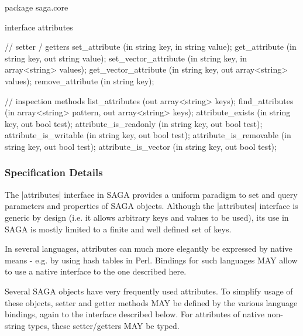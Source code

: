  \begin{myspec}
  package saga.core
  {
    interface attributes
    {
      // setter / getters
      set_attribute           (in  string          key,
                               in  string          value);
      get_attribute           (in  string          key,
                               out string          value);
      set_vector_attribute    (in  string          key,
                               in  array<string>   values);
      get_vector_attribute    (in  string          key,
                               out array<string>   values);
      remove_attribute        (in  string          key);
 
      // inspection methods
      list_attributes         (out array<string>   keys);
      find_attributes         (in  array<string>   pattern,
                               out array<string>   keys);
      attribute_exists        (in  string          key,
                               out bool            test);
      attribute_is_readonly   (in  string          key,
                               out bool            test);
      attribute_is_writable   (in  string          key,
                               out bool            test);
      attribute_is_removable  (in  string          key,
                               out bool            test);
      attribute_is_vector     (in  string          key,
                               out bool            test);
    }
  }
 \end{myspec}
 
 \subsubsection{Specification Details}
 
  The |attributes| interface in SAGA provides a uniform paradigm
  to set and query parameters and properties of SAGA objects.
  Although the |attributes| interface is generic by design (i.e.
  it allows arbitrary keys and values to be used), its use in
  SAGA is mostly limited to a finite and well defined set of
  keys.
 
  In several languages, attributes can much more elegantly
  be expressed by native means - e.g. by using hash
  tables in Perl.  Bindings for such languages MAY allow to use
  a native interface  to the one described here.
 
  Several SAGA objects have very frequently used attributes.  To
  simplify usage of these objects, setter and getter methods MAY
  be defined by the various language bindings, again
   to the interface described below.  For
  attributes of native non-string types, these setter/getters
  MAY be typed.
 
